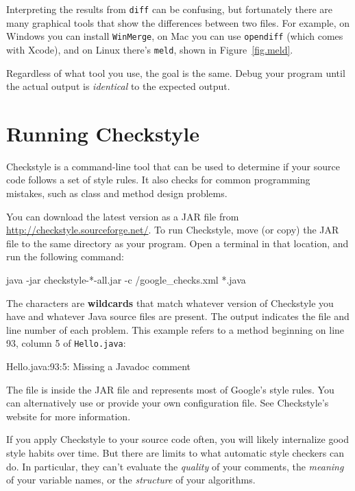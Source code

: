 Interpreting the results from {\tt diff} can be confusing, but fortunately there are many graphical tools that show the differences between two files.
For example, on Windows you can install {\tt WinMerge}, on Mac you can use {\tt opendiff} (which comes with Xcode), and on Linux there's {\tt meld}, shown in Figure~\ref{fig.meld}.

Regardless of what tool you use, the goal is the same.
Debug your program until the actual output is {\em identical} to the expected output.


\section{Running Checkstyle}
\label{checkstyle}


Checkstyle is a command-line tool that can be used to determine if your source code follows a set of style rules.
It also checks for common programming mistakes, such as class and method design problems.

You can download the latest version as a JAR file from \url{http://checkstyle.sourceforge.net/}.
To run Checkstyle, move (or copy) the JAR file to the same directory as your program.
Open a terminal in that location, and run the following command:

\begin{stdout}
java -jar checkstyle-*-all.jar -c /google_checks.xml *.java
\end{stdout}


The {\tt *} characters are {\bf wildcards} that match whatever version of Checkstyle you have and whatever Java source files are present.
The output indicates the file and line number of each problem.
This example refers to a method beginning on line 93, column 5 of {\tt Hello.java}:

\begin{stdout}
Hello.java:93:5: Missing a Javadoc comment
\end{stdout}

The file  is inside the JAR file and represents most of Google's style rules.
You can alternatively use  or provide your own configuration file.
See Checkstyle's website for more information.

If you apply Checkstyle to your source code often, you will likely internalize good style habits over time.
But there are limits to what automatic style checkers can do.
In particular, they can't evaluate the {\em quality} of your comments, the {\em meaning} of your variable names, or the {\em structure} of your algorithms.

